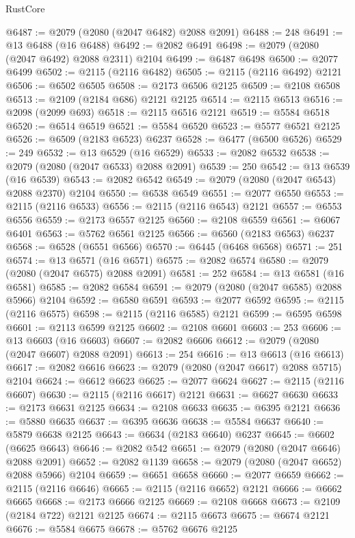 \begin{lexlean}{RustCore}
\begin{coremodule}
@6487 := @2079 (@2080 (@2047 @6482) @2088 @2091)
@6488 := 248
@6491 := @13 @6488 (@16 @6488)
@6492 := @2082 @6491
@6498 := @2079 (@2080 (@2047 @6492) @2088 @2311) @2104
@6499 := @6487 @6498
@6500 := @2077 @6499
@6502 := @2115 (@2116 @6482)
@6505 := @2115 (@2116 @6492) @2121
@6506 := @6502 @6505
@6508 := @2173 @6506 @2125
@6509 := @2108 @6508
@6513 := @2109 (@2184 @686) @2121 @2125
@6514 := @2115 @6513
@6516 := @2098 (@2099 @693)
@6518 := @2115 @6516 @2121
@6519 := @5584 @6518
@6520 := @6514 @6519
@6521 := @5584 @6520
@6523 := @5577 @6521 @2125
@6526 := @6509 (@2183 @6523) @6237
@6528 := @6477 (@6500 @6526)
@6529 := 249
@6532 := @13 @6529 (@16 @6529)
@6533 := @2082 @6532
@6538 := @2079 (@2080 (@2047 @6533) @2088 @2091)
@6539 := 250
@6542 := @13 @6539 (@16 @6539)
@6543 := @2082 @6542
@6549 := @2079 (@2080 (@2047 @6543) @2088 @2370) @2104
@6550 := @6538 @6549
@6551 := @2077 @6550
@6553 := @2115 (@2116 @6533)
@6556 := @2115 (@2116 @6543) @2121
@6557 := @6553 @6556
@6559 := @2173 @6557 @2125
@6560 := @2108 @6559
@6561 := @6067 @6401
@6563 := @5762 @6561 @2125
@6566 := @6560 (@2183 @6563) @6237
@6568 := @6528 (@6551 @6566)
@6570 := @6445 (@6468 @6568)
@6571 := 251
@6574 := @13 @6571 (@16 @6571)
@6575 := @2082 @6574
@6580 := @2079 (@2080 (@2047 @6575) @2088 @2091)
@6581 := 252
@6584 := @13 @6581 (@16 @6581)
@6585 := @2082 @6584
@6591 := @2079 (@2080 (@2047 @6585) @2088 @5966) @2104
@6592 := @6580 @6591
@6593 := @2077 @6592
@6595 := @2115 (@2116 @6575)
@6598 := @2115 (@2116 @6585) @2121
@6599 := @6595 @6598
@6601 := @2113 @6599 @2125
@6602 := @2108 @6601
@6603 := 253
@6606 := @13 @6603 (@16 @6603)
@6607 := @2082 @6606
@6612 := @2079 (@2080 (@2047 @6607) @2088 @2091)
@6613 := 254
@6616 := @13 @6613 (@16 @6613)
@6617 := @2082 @6616
@6623 := @2079 (@2080 (@2047 @6617) @2088 @5715) @2104
@6624 := @6612 @6623
@6625 := @2077 @6624
@6627 := @2115 (@2116 @6607)
@6630 := @2115 (@2116 @6617) @2121
@6631 := @6627 @6630
@6633 := @2173 @6631 @2125
@6634 := @2108 @6633
@6635 := @6395 @2121
@6636 := @5880 @6635
@6637 := @6395 @6636
@6638 := @5584 @6637
@6640 := @5879 @6638 @2125
@6643 := @6634 (@2183 @6640) @6237
@6645 := @6602 (@6625 @6643)
@6646 := @2082 @542
@6651 := @2079 (@2080 (@2047 @6646) @2088 @2091)
@6652 := @2082 @1139
@6658 := @2079 (@2080 (@2047 @6652) @2088 @5966) @2104
@6659 := @6651 @6658
@6660 := @2077 @6659
@6662 := @2115 (@2116 @6646)
@6665 := @2115 (@2116 @6652) @2121
@6666 := @6662 @6665
@6668 := @2173 @6666 @2125
@6669 := @2108 @6668
@6673 := @2109 (@2184 @722) @2121 @2125
@6674 := @2115 @6673
@6675 := @6674 @2121
@6676 := @5584 @6675
@6678 := @5762 @6676 @2125

\end{coremodule}
\end{lexlean}
